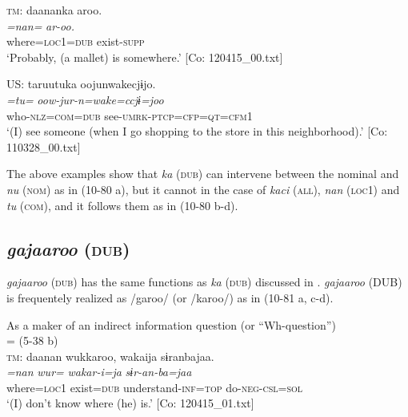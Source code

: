   \ex  \textsc{tm}:
      \glll    daananka  aroo.\\
      \textit{=nan=}  \textit{ar-oo.}\\
      where=\textsc{loc}1=\textsc{dub}  exist-\textsc{supp}\\
      \glt       ‘Probably, (a mallet) is somewhere.’ [Co: 120415\_00.txt]

  \ex   US: \glll taruutuka  oojunwakecjɨjo.\\
      \textit{=tu=}  \textit{oow-jur-n=wake=ccjɨ=joo}\\
      who-\textsc{nlz}=\textsc{com}=\textsc{dub}  see-\textsc{umrk}-\textsc{ptcp}=\textsc{cfp}=\textsc{qt}=\textsc{cfm}1\\
      \glt       ‘(I) see someone (when I go shopping to the store in this neighborhood).’ [Co: 110328\_00.txt]
    \z
\z

The above examples show that \textit{ka} (\textsc{dub}) can intervene between the nominal and \textit{nu} (\textsc{nom}) as in (10-80 a), but it cannot in the case of \textit{kaci} (\textsc{all}), \textit{nan} (\textsc{loc}1) and \textit{tu} (\textsc{com}), and it follows them as in (10-80 b-d).

\subsection{\textit{gajaaroo} (\textsc{dub})}\label{sec:10.4.3}

\textit{gajaaroo} (\textsc{dub}) has the same functions as \textit{ka} (\textsc{dub}) discussed in . \textit{gajaaroo} (DUB) is frequentely realized as /garoo/ (or /karoo/) as in (10-81 a, c-d).

\ea\label{ex:10.81}   As a maker of an indirect information question (or “Wh-question”)\\
  \ea{} = (5-38 b)\\
    \textsc{tm}:
      \glll    daanan  wukkaroo,  wakaija  sɨranbajaa.\\
      \textit{=nan}  \textit{wur=}  \textit{wakar-i=ja}  \textit{sɨr-an-ba=jaa}\\
      where=\textsc{loc}1  exist=\textsc{dub}  understand-\textsc{inf}=\textsc{top}  do-\textsc{neg}-\textsc{csl}=\textsc{sol}\\
      \glt       ‘(I) don’t know where (he) is.’ [Co: 120415\_01.txt]

